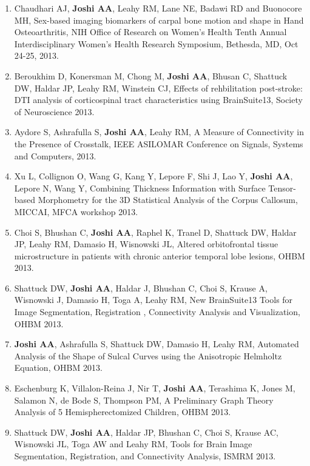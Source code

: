 \documentclass[overlapped,line,letterpaper]{res}
\begin{document}
\begin{resume}
\begin{enumerate}
    \item Chaudhari AJ, \textbf{Joshi AA}, Leahy RM, Lane NE, Badawi RD and Buonocore MH, {Sex-based imaging biomarkers of carpal bone motion and shape in Hand Osteoarthritis}, NIH Office of Research on Women's Health Tenth Annual Interdisciplinary Women's Health Research Symposium, Bethesda, MD, Oct 24-25, 2013.

    \item Beroukhim D, Konersman M, Chong M, \textbf{Joshi AA}, Bhusan C, Shattuck DW, Haldar JP, Leahy RM, Winstein CJ, {Effects of rehbilitation post-stroke: DTI analysis of corticospinal tract characteristics using BrainSuite13}, Society of Neuroscience 2013.

    \item Aydore S, Ashrafulla S, \textbf{Joshi AA}, Leahy RM, {A Measure of Connectivity in the Presence of Crosstalk}, IEEE ASILOMAR Conference on Signals, Systems and Computers, 2013.

    \item Xu L, Collignon O, Wang G, Kang Y, Lepore F, Shi J, Lao Y, \textbf{Joshi AA}, Lepore N, Wang Y, {Combining Thickness Information with Surface Tensor-based Morphometry for the 3D Statistical Analysis of the Corpus Callosum}, MICCAI, MFCA workshop 2013.

    \item Choi S, Bhushan C, \textbf{Joshi AA}, Raphel K, Tranel D, Shattuck DW, Haldar JP, Leahy RM, Damasio H, Wisnowski JL, {Altered orbitofrontal tissue microstructure in patients with chronic anterior temporal lobe lesions}, OHBM 2013.

    \item Shattuck DW, \textbf{Joshi AA}, Haldar J, Bhushan C, Choi S, Krause A, Wisnowski J, Damasio H, Toga A, Leahy RM, {New BrainSuite13 Tools for Image Segmentation, Registration , Connectivity Analysis and Visualization}, OHBM 2013.

    \item \textbf{Joshi AA}, Ashrafulla S, Shattuck DW, Damasio H, Leahy RM, {Automated Analysis of the Shape of Sulcal Curves using the Anisotropic Helmholtz Equation}, OHBM 2013.

    \item Eschenburg K, Villalon-Reina J, Nir T, \textbf{Joshi AA}, Terashima K, Jones M, Salamon N, de Bode S, Thompson PM, {A Preliminary Graph Theory Analysis of 5 Hemispherectomized Children}, OHBM 2013.

    \item Shattuck DW, \textbf{Joshi AA}, Haldar JP, Bhushan C, Choi S, Krause AC, Wisnowski JL, Toga AW and Leahy RM, {Tools for Brain Image Segmentation, Registration, and Connectivity Analysis}, ISMRM 2013. 


\end{enumerate}
\end{resume}
\end{document}
